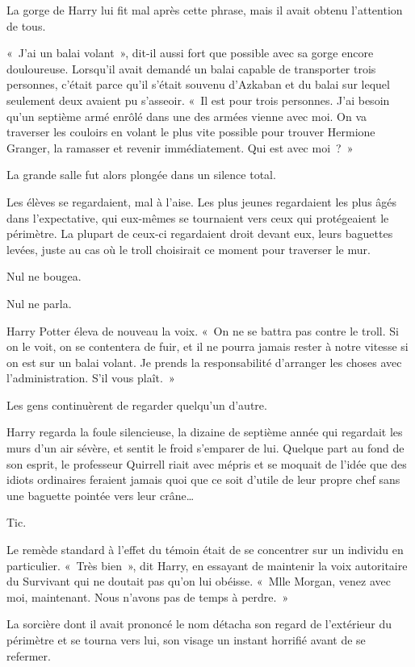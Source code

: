 La gorge de Harry lui fit mal après cette phrase, mais il avait obtenu l'attention de tous.

«~J'ai un balai volant~», dit-il aussi fort que possible avec sa gorge encore douloureuse. Lorsqu'il avait demandé un balai capable de transporter trois personnes, c'était parce qu'il s'était souvenu d'Azkaban et du balai sur lequel seulement deux avaient pu s'asseoir. «~Il est pour trois personnes. J'ai besoin qu'un septième armé enrôlé dans une des armées vienne avec moi. On va traverser les couloirs en volant le plus vite possible pour trouver Hermione Granger, la ramasser et revenir immédiatement. Qui est avec moi~?~»

La grande salle fut alors plongée dans un silence total.

Les élèves se regardaient, mal à l'aise. Les plus jeunes regardaient les plus âgés dans l'expectative, qui eux-mêmes se tournaient vers ceux qui protégeaient le périmètre. La plupart de ceux-ci regardaient droit devant eux, leurs baguettes levées, juste au cas où le troll choisirait ce moment pour traverser le mur.

Nul ne bougea.

Nul ne parla.

Harry Potter éleva de nouveau la voix. «~On ne se battra pas contre le troll. Si on le voit, on se contentera de fuir, et il ne pourra jamais rester à notre vitesse si on est sur un balai volant. Je prends la responsabilité d'arranger les choses avec l'administration. S'il vous plaît.~»

Les gens continuèrent de regarder quelqu'un d'autre.

Harry regarda la foule silencieuse, la dizaine de septième année qui regardait les murs d'un air sévère, et sentit le froid s'emparer de lui. Quelque part au fond de son esprit, le professeur Quirrell riait avec mépris et se moquait de l'idée que des idiots ordinaires feraient jamais quoi que ce soit d'utile de leur propre chef sans une baguette pointée vers leur crâne…

Tic.

Le remède standard à l'effet du témoin était de se concentrer sur un individu en particulier. «~Très bien~», dit Harry, en essayant de maintenir la voix autoritaire du Survivant qui ne doutait pas qu'on lui obéisse. «~Mlle Morgan, venez avec moi, maintenant. Nous n'avons pas de temps à perdre.~»

La sorcière dont il avait prononcé le nom détacha son regard de l'extérieur du périmètre et se tourna vers lui, son visage un instant horrifié avant de se refermer.

